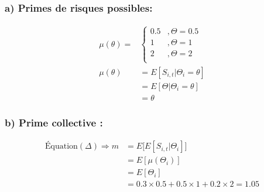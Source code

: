 \documentclass[11pt,french]{report}
\begin{document}
\subsubsection*{a) Primes de risques possibles:}
\begin{align*}
\mu(\theta) = & \left\{
     \begin{array}{rl}
      0.5 &, \Theta = 0.5 \\
      1 &, \Theta = 1 \\
      2 &, \Theta = 2 \\
     \end{array}
     \right. \\
\mu(\theta) &= E[S_{i,t}|\Theta_i = \theta]\\
&= E[\Theta|\Theta_i = \theta] \\
&= \theta
\end{align*}

\subsubsection*{b) Prime collective :}
\begin{align*}
\text{Équation}(\Delta) \Rightarrow m &= E\Big[E[S_{i,t}|\Theta_i] \Big] \\
&= E[\mu(\Theta_i)]\\
&=E[\Theta_i]\\
&= 0.3 \times  0.5 + 0.5\times 1 + 0.2\times 2 = 1.05
\end{align*}
\end{document}
